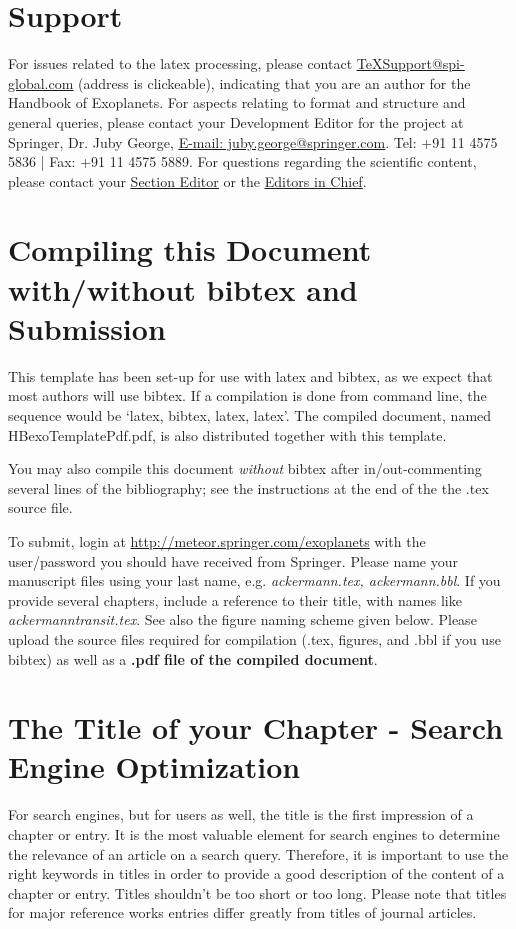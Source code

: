 \documentclass[graybox,natbib,nosecnum]{svmult}
\begin{document}
\section{Support}
For issues related to the latex processing, please contact \href {mailto:TeXSupport@spi-global.com}{\ul{TeXSupport@spi-global.com}} (address is clickeable), indicating that you are an author for the Handbook of Exoplanets. For aspects relating to format and structure and general queries, please contact your Development Editor for the project at Springer, Dr. Juby George, \href{mailto:juby.george@springer.com}{\ul{E-mail: juby.george@springer.com}}. Tel: +91 11 4575 5836 | Fax: +91 11 4575 5889. For questions regarding the scientific content, please contact your \href{https://meteor.springer.com/exoplanets/?id=435&tab=About&mode=ReadPage&entity=1870}{\ul{Section Editor}} or the \href{https://meteor.springer.com/exoplanets/?id=435&tab=About&mode=ReadPage&entity=1359}{\ul{Editors in Chief}}.

\section{Compiling this Document with/without bibtex and Submission}
This template has been set-up for use with latex and bibtex, as we expect that most authors will use bibtex.  If a compilation is done from command line, the sequence would be `latex, bibtex, latex, latex'. The compiled document, named HBexoTemplatePdf.pdf, is also distributed together with this template.

You may also compile this document \emph{without} bibtex after in/out-commenting several lines of the bibliography; see the instructions at the end of the the .tex source file.  

 To submit, login at \url{http://meteor.springer.com/exoplanets} with the user/password you should have received from Springer. Please name your manuscript files using your last name, e.g. \emph{ackermann.tex, ackermann.bbl}. If you provide several chapters, include a reference to their title, with names like \emph{ackermann\textunderscore transit.tex}. See also the figure naming scheme given below. Please upload the source files required for compilation (.tex, figures, and .bbl if you use bibtex) as well as a {\bf .pdf file of the compiled document}.

\section{The Title of your Chapter - Search Engine Optimization} 
For search engines, but for users as well, the title is the first impression of a chapter or entry. It is the most valuable element for search engines to determine the relevance of an article on a search query. Therefore, it is important to use the right keywords in titles in order to provide a good description of the content of a chapter or entry. Titles shouldn't be too short or too long. Please note that titles for major reference works entries differ greatly from titles of journal articles.
\end{document}
